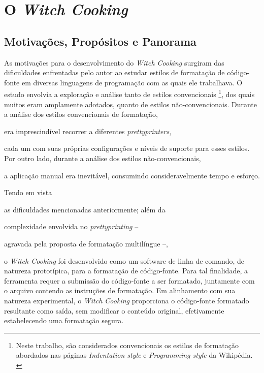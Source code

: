 \documentclass
  [11pt, a4paper, english, openright, sumario = tradicional, twoside, brazil]
  {abntex2}
\newcommand{\witchcooking}{\textit{Witch Cooking}\xspace}
\begin{document}

  \chapter{O \witchcooking}

  \section{Motivações, Propósitos e Panorama}

  As motivações para o desenvolvimento do \witchcooking surgiram das
  dificuldades enfrentadas pelo autor ao estudar estilos de formatação de
  código-fonte em diversas linguagens de programação com as quais ele
  trabalhava. O estudo envolvia a exploração e análise tanto de estilos
  convencionais%
  \footnote
    {Neste trabalho, são considerados convencionais os estilos de formatação
     abordados nas páginas \textit{Indentation style} e
     \textit{Programming style} da Wikipédia.
     \cites{wiki-2023-indentation}{wiki-2023-programming}},
  dos quais muitos eram amplamente adotados, quanto de estilos
  não-convencionais. Durante a análise dos estilos convencionais de formatação,
  \begin{inparaenum}
    \item era imprescindível recorrer a diferentes \textit{prettyprinters},
    \item cada um com suas próprias configurações e níveis de suporte para
          esses estilos. Por outro lado, durante a análise dos estilos
          não-convencionais,
    \item a aplicação manual era inevitável, consumindo consideravelmente tempo
          e esforço.
  \end{inparaenum}

  Tendo em vista
  \begin{inparaenum}
    \item as dificuldades mencionadas anteriormente; além da
    \item complexidade envolvida no \textit{prettyprinting} --
    \item agravada pela proposta de formatação multilíngue --,
  \end{inparaenum}
  o \witchcooking foi desenvolvido como um software de linha de comando, de
  natureza prototípica, para a formatação de código-fonte. Para tal finalidade,
  a ferramenta requer a submissão do código-fonte a ser formatado, juntamente
  com o arquivo contendo as instruções de formatação. Em alinhamento com sua
  natureza experimental, o \witchcooking proporciona o código-fonte formatado
  resultante como saída, sem modificar o conteúdo original, efetivamente
  estabelecendo uma formatação segura.
\end{document}
